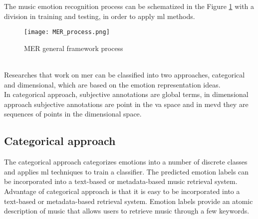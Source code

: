 The music emotion recognition process can be schematized in the Figure \ref{fig:MER_process} with a division in training and testing, in order to apply \gls{ml} methods.
\begin{figure}[h]
    \centering
    \texttt{[image: MER\_process.png]} 
	\caption{MER general framework process}
    \label{fig:MER_process}
\end{figure}
\\
Researches that work on \gls{mer} can be classified into two approaches, categorical and dimensional, which are based on the emotion representation ideas.
\\
In categorical approach, subjective annotations are global terms, in dimensional approach subjective annotations are point in the \gls{va} space and in \gls{mevd} they are sequences of points in the dimensional space.

\subsection{Categorical approach}
The categorical approach categorizes emotions into a number of discrete classes and applies \gls{ml} techniques to train a classifier. The predicted emotion labels can be incorporated into a text-based or metadata-based music retrieval system.
\\
Advantage of categorical approach is that it is easy to be incorporated into a text-based or metadata-based retrieval system. Emotion labels provide an atomic description of music that allows users to retrieve music through a few keywords.

